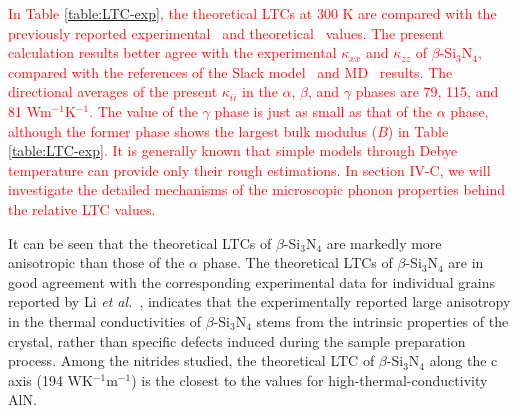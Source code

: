 \documentclass[twocolumn,amsmath,amssymb,a4paper,prb,superscriptaddress,floatfix]{revtex4-1}
\begin{document}
\textcolor{red}{ In Table \ref{table:LTC-exp}, the theoretical LTCs at
	300 K are compared with the previously reported experimental~\cite{hirosaki,hirai,li,slack-aln} and
	theoretical~\cite{morelli,hirosaki-md,phono3py} values. The present calculation results better agree
with the experimental $\kappa$$_{xx}$ and $\kappa$$_{zz}$ of
$\beta$-Si$_3$N$_4$, compared with the references of the Slack model~\cite{morelli}
and MD~\cite{hirosaki-md} results. The directional averages of the present $\kappa_{ii}$
in the $\alpha$, $\beta$, and $\gamma$ phases are 79, 115, and 81
Wm$^{-1}$K$^{-1}$. The value of the $\gamma$ phase is just as small as
that of the $\alpha$ phase, although the former phase shows the largest
bulk modulus ($B$) in Table \ref{table:LTC-exp}. It is generally known
that simple models through Debye temperature can provide only their
rough estimations. In section IV-C, we will investigate the detailed
mechanisms of the microscopic phonon properties behind the relative LTC
values.}

It can be seen that the theoretical LTCs of $\beta$-Si$_3$N$_4$ are
markedly more anisotropic than those of the $\alpha$ phase. The
theoretical LTCs of $\beta$-Si$_3$N$_4$ are in good agreement with the
corresponding experimental data for individual grains reported by Li
{\it et al.}~\cite{li}, indicates that the experimentally reported large
anisotropy in the thermal conductivities of $\beta$-Si$_3$N$_4$ stems
from the intrinsic properties of the crystal, rather than specific
defects induced during the sample preparation process. Among the
nitrides studied, the theoretical LTC of $\beta$-Si$_3$N$_4$ along the c
axis (194 WK$^{-1}$m$^{-1}$) is the closest to the values for
high-thermal-conductivity AlN.
\end{document}
